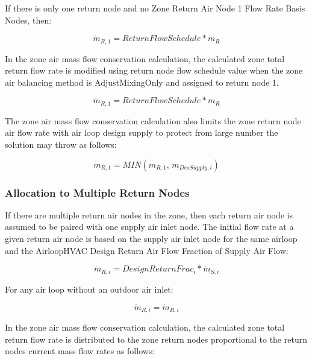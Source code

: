 If there is only one return node and no Zone Return Air Node 1 Flow Rate Basis Nodes, then:

\begin{equation}
{\dot m_{R,1}} = ReturnFlowSchedule*{\dot m_{R}}
\end{equation}

In the zone air mass flow conservation calculation, the calculated zone total return flow rate is modified using return node flow schedule value when the zone air balancing method is AdjustMixingOnly and assigned to return node 1.  

\begin{equation}
{\dot m_{R,1}} = ReturnFlowSchedule*{\dot m_{R}}
\end{equation}

The zone air mass flow conservation calculation also limits the zone return node air flow rate with air loop design supply to protect from large number the solution may throw as follows:

\begin{equation}
{\dot m_{R,1}} = MIN\left( {{\dot m_{R,1}},\,{{\dot m}_{DesSupply,i}}} \right) 
\end{equation} 

\subsubsection{Allocation to Multiple Return Nodes}\label{allocation-to-multiple-return-nodes}

If there are multiple return air nodes in the zone, then each return air node is assumed to be paired with one supply air inlet node. The initial flow rate at a given return air node is based on the supply air inlet node for the same airloop and the AirloopHVAC Design Return Air Flow Fraction of Supply Air Flow:

\begin{equation}
{\dot m_{R,i}} = {DesignReturnFrac_i} * {\dot m_{S,i}}
\end{equation}

For any air loop without an outdoor air inlet:

\begin{equation}
{\dot m_{R,i}} = {\dot m_{R,i}}
\end{equation}

In the zone air mass flow conservation calculation, the calculated zone total return flow rate is distributed to the zone return nodes proportional to the return nodes current mass flow rates as follows:

